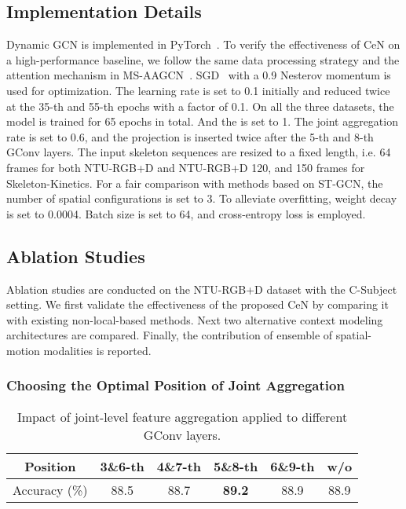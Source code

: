 \documentclass[sigconf]{acmart}
\begin{document}
\subsection{Implementation Details}
Dynamic GCN is implemented in PyTorch~\cite{paszke2017automatic}. To verify the effectiveness of CeN on a high-performance baseline, we follow the same data processing strategy and the attention mechanism in MS-AAGCN~\cite{shi2019}. SGD~\cite{bottou2010large} with a 0.9 Nesterov momentum is used for optimization. The learning rate is set to 0.1 initially and reduced twice at the 35-th and 55-th epochs with a factor of 0.1. On all the three datasets, the model is trained for 65 epochs in total. And the  is set to 1. The joint aggregation rate  is set to 0.6, and the projection  is inserted twice after the 5-th and 8-th GConv layers. The input skeleton sequences are resized to a fixed length, i.e. 64 frames for both NTU-RGB+D and NTU-RGB+D 120, and 150 frames for Skeleton-Kinetics. For a fair comparison with methods based on ST-GCN, the number of spatial configurations is set to 3. To alleviate overfitting, weight decay is set to 0.0004. Batch size is set to 64, and cross-entropy loss is employed.

\subsection{Ablation Studies}

Ablation studies are conducted on the NTU-RGB+D dataset with the C-Subject setting. We first validate the effectiveness of the proposed CeN by comparing it with existing non-local-based methods. Next two alternative context modeling architectures are compared. Finally, the contribution of ensemble of spatial-motion modalities is reported.

\subsubsection{Choosing the Optimal Position of Joint Aggregation}



\begin{table}[t]
  \centering
  \caption{Impact of joint-level feature aggregation applied to different GConv layers.}
    \begin{tabular}{c|c|c|c|c|c}
    \toprule
    Position & 3\&6-th & 4\&7-th & 5\&8-th & 6\&9-th & w/o  \\
    \midrule
    Accuracy (\%) & 88.5  & 88.7  & \textbf{89.2} & 88.9  & 88.9 \\
    \bottomrule
    \end{tabular}\label{tab:feat-agg}\end{table}
\end{document}
